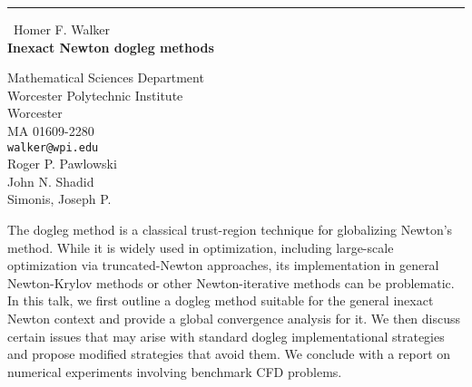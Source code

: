 \documentclass{report}
\begin{document}
\begin{center}
\rule{6in}{1pt} \
{\large Homer F. Walker \\
{\bf Inexact Newton dogleg methods}}

Mathematical Sciences Department \\ Worcester Polytechnic Institute \\ Worcester \\ MA 01609-2280
\\
{\tt walker@wpi.edu}\\
Roger P.  Pawlowski\\
John N.  Shadid\\
	Simonis, Joseph P. \end{center}

The dogleg method is a classical trust-region technique for globalizing Newton's method.
While it is widely used in optimization,
including large-scale optimization via truncated-Newton approaches,
its implementation in general Newton-Krylov methods or other Newton-iterative methods can be problematic.
In this talk,
we first outline a dogleg method suitable for the general inexact Newton context and provide a global convergence analysis for it.
We then discuss certain issues that may arise with standard dogleg implementational strategies and propose modified strategies that avoid them.
We conclude with a report on numerical experiments involving benchmark CFD problems.
\end{document}
